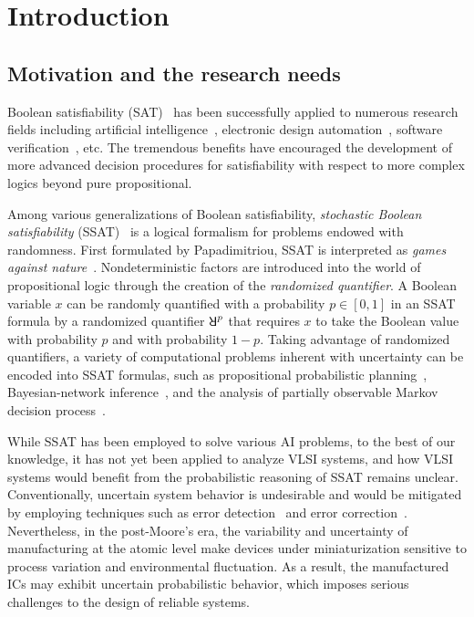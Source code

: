 \chapter{Introduction}
\label{chap:introduction}

\section{Motivation and the research needs}
Boolean satisfiability (SAT)~\cite{SATHandbook} has been successfully applied to numerous research fields
including artificial intelligence~\cite{Nilsson2014,Russell2020},
electronic design automation~\cite{Marques2000,Wang2009},
software verification~\cite{Jhala2009, Berard2013}, etc.
The tremendous benefits have encouraged the development of more advanced decision procedures
for satisfiability with respect to more complex logics beyond pure propositional.

Among various generalizations of Boolean satisfiability,
\textit{stochastic Boolean satisfiability} (SSAT)~\cite{SATHandbook-SSAT} is a logical formalism
for problems endowed with randomness.
First formulated by Papadimitriou,
SSAT is interpreted as \textit{games against nature}~\cite{Papadimitriou1985}.
Nondeterministic factors are introduced into the world of propositional logic
through the creation of the \textit{randomized quantifier}.
A Boolean variable $x$ can be randomly quantified with a probability $p\in[0,1]$ in an SSAT formula
by a randomized quantifier $\random{p}$ that requires $x$ to take the Boolean value
\true with probability $p$ and
\false with probability $1-p$.
Taking advantage of randomized quantifiers,
a variety of computational problems inherent with uncertainty can be encoded into SSAT formulas,
such as propositional probabilistic planning~\cite{Littman1998},
Bayesian-network inference~\cite{Cooper1990,Jensen1996,Bacchus2003},
and the analysis of partially observable Markov decision process~\cite{Majercik2003}.

While SSAT has been employed to solve various AI problems,
to the best of our knowledge,
it has not yet been applied to analyze VLSI systems,
and how VLSI systems would benefit from the probabilistic reasoning of SSAT remains unclear.
Conventionally, uncertain system behavior is undesirable and
would be mitigated by employing techniques such as
error detection~\cite{Constantinescu2003} and error correction~\cite{Mitra2006}.
Nevertheless, in the post-Moore's era,
the variability and uncertainty of manufacturing at the atomic level
make devices under miniaturization sensitive to process variation and environmental fluctuation.
As a result, the manufactured ICs may exhibit uncertain probabilistic behavior,
which imposes serious challenges to the design of reliable systems.

